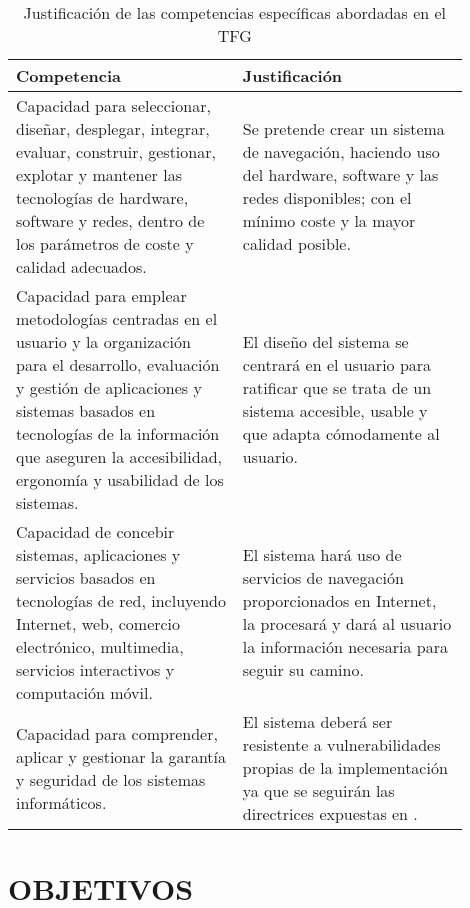 \documentclass{pre-tfg}
\begin{document}
\begin{spacing}{1.1}
\begin{longtable}{p{0.45\linewidth}p{0.45\linewidth}}
  \caption{Justificación de las competencias específicas abordadas en el TFG}
  \label{tab:competencias} \\

  \textbf{Competencia} & \textbf{Justificación} \\
  \hline
  \hline
    Capacidad para seleccionar, diseñar, desplegar, integrar, evaluar, construir, gestionar,
    explotar y mantener las tecnologías de hardware, software y redes, dentro de los parámetros de
    coste y calidad adecuados. & Se pretende crear un sistema de navegación, haciendo uso del
    hardware, software y las redes disponibles; con el mínimo coste y la mayor calidad posible.\\

    Capacidad para emplear metodologías centradas en el usuario y la organización para el
    desarrollo, evaluación y gestión de aplicaciones y sistemas basados en tecnologías de la
    información que aseguren la accesibilidad, ergonomía y usabilidad de los sistemas. & El diseño
    del sistema se centrará en el usuario para ratificar que se trata de un sistema accesible,
    usable y que adapta cómodamente al usuario.\\

    Capacidad de concebir sistemas, aplicaciones y servicios basados en tecnologías de red,
    incluyendo Internet, web, comercio electrónico, multimedia, servicios interactivos y computación
    móvil. & El sistema hará uso de servicios de navegación proporcionados en Internet, la procesará
    y dará al usuario la información necesaria para seguir su camino.\\

    Capacidad para comprender, aplicar y gestionar la garantía y seguridad de los sistemas
    informáticos. & El sistema deberá ser resistente a vulnerabilidades propias de la implementación
    ya que se seguirán las directrices expuestas en \cite{Moreno13}.\\

  \hline
\end{longtable}
\end{spacing}

\section{OBJETIVOS}
\end{document}
